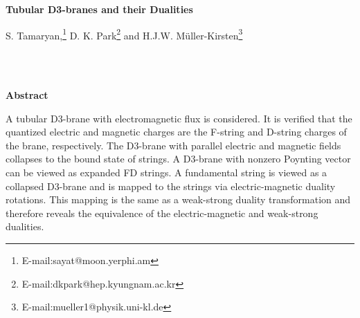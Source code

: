 \documentclass[a4paper,12pt]{article}
\begin{document}
\setlength{\textheight}{9.4in}
\setlength{\topmargin}{-0.6in}
\setlength{\oddsidemargin}{0.15in}
\setlength{\evensidemargin}{0.4in}
\renewcommand{\thefootnote}{\fnsymbol{footnote}}
\providecommand{\e}{{\bf E}}
\providecommand{\m}{{\bf B}}
\providecommand{\h}{{\bf H}}
\renewcommand{\d}{{\bf D}}
\rightline{}

\vspace{1cm}

\begin{center}
{\Large {\bf Tubular D3-branes and their Dualities}}
\vspace{1truecm}

\large 
{S. Tamaryan,\coordHE{}\footnote[1]
{E-mail:sayat@moon.yerphi.am}
D. K. Park\coordHE{}\footnote[2]
{E-mail:dkpark@hep.kyungnam.ac.kr}
and H.J.W. M\"uller-Kirsten\coordHE{}\footnote[3]
{E-mail:mueller1@physik.uni-kl.de}}

\vspace{0.8cm}

\normalsize
{}\\
\vspace{0.4cm}
\\
\vspace{0.4cm}
\end{center}
\vspace{0.6cm}

{\centerline {\bf Abstract}}

\vspace{0.4cm}

A tubular D3-brane with electromagnetic flux is considered. It is verified 
that the quantized electric and magnetic charges are the F-string and D-string 
charges of the brane, respectively. The D3-brane with parallel electric 
and magnetic fields collapses to the bound state of strings. A D3-brane with 
nonzero Poynting vector can be viewed as expanded FD strings. A 
fundamental string is viewed as a collapsed D3-brane and is mapped to the 
\coordHE{} strings via electric-magnetic duality rotations. This mapping is 
the same as a weak-strong duality transformation and therefore reveals the 
equivalence of the electric-magnetic and weak-strong dualities.
\end{document}
